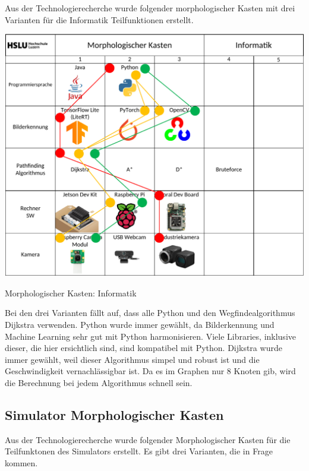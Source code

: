 Aus der Technologierecherche wurde folgender morphologischer Kasten mit drei Varianten für die Informatik Teilfunktionen erstellt.

\begin{table}[H]
\centering
\includegraphics[width=\textwidth]{assets/MK_Informatik.pdf}
\caption{Morphologischer Kasten: Informatik}
\label{table:mk-informatik}
\end{table}


Bei den drei Varianten fällt auf, dass alle Python und den Wegfindealgorithmus Dijkstra verwenden. Python wurde immer gewählt, da Bilderkennung und Machine Learning sehr gut mit Python harmonisieren. Viele Libraries, inklusive dieser, die hier ersichtlich sind, sind kompatibel mit Python. Dijkstra wurde immer gewählt, weil dieser Algorithmus simpel und robust ist und die Geschwindigkeit vernachlässigbar ist. Da es im Graphen nur 8 Knoten gib, wird die Berechnung bei jedem Algorithmus schnell sein.

\subsection{Simulator Morphologischer Kasten}


Aus der Technologierecherche wurde folgender Morphologischer Kasten für die Teilfunktonen des Simulators erstellt. Es gibt drei Varianten, die in Frage kommen.

